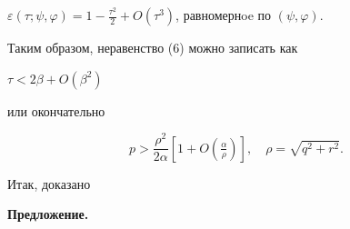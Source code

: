 $\varepsilon (\tau;\psi,\varphi)=1 - \frac{{\tau ^2}}


{2}+O(\tau ^3)$, равномернoe по $(\psi, \varphi)$.





Таким образом, неравенство (6) можно записать как


$\tau < 2\beta+O(\beta ^2)$


или окончательно


\begin{equation}


p > \frac{{\rho ^2}}{{2\alpha}}


[{1+O(\tfrac{\alpha}{\rho})}], \quad \rho=\sqrt {q^2+r^2}.


\end{equation}





Итак, доказано


\medskip





{\bf Предложение.}


